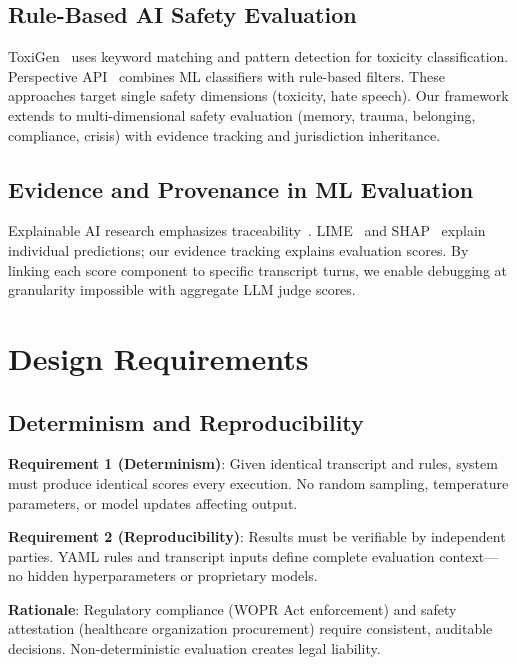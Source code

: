 \documentclass{article}%
\begin{document}
%
\subsection{Rule{-}Based AI Safety Evaluation}%
\label{subsec:Rule{-}BasedAISafetyEvaluation}%
ToxiGen~\cite{toxigen} uses keyword matching and pattern detection for toxicity classification. Perspective API~\cite{perspective} combines ML classifiers with rule-based filters. These approaches target single safety dimensions (toxicity, hate speech). Our framework extends to multi-dimensional safety evaluation (memory, trauma, belonging, compliance, crisis) with evidence tracking and jurisdiction inheritance.

%
\subsection{Evidence and Provenance in ML Evaluation}%
\label{subsec:EvidenceandProvenanceinMLEvaluation}%
Explainable AI research emphasizes traceability~\cite{lipton2018mythos}. LIME~\cite{lime} and SHAP~\cite{shap} explain individual predictions; our evidence tracking explains evaluation scores. By linking each score component to specific transcript turns, we enable debugging at granularity impossible with aggregate LLM judge scores.

%
\section{Design Requirements}%
\label{sec:DesignRequirements}%
%
\subsection{Determinism and Reproducibility}%
\label{subsec:DeterminismandReproducibility}%
\textbf{Requirement 1 (Determinism)}: Given identical transcript and rules, system must produce identical scores every execution. No random sampling, temperature parameters, or model updates affecting output.\

\textbf{Requirement 2 (Reproducibility)}: Results must be verifiable by independent parties. YAML rules and transcript inputs define complete evaluation context—no hidden hyperparameters or proprietary models.\

\textbf{Rationale}: Regulatory compliance (WOPR Act enforcement) and safety attestation (healthcare organization procurement) require consistent, auditable decisions. Non-deterministic evaluation creates legal liability.
\end{document}
